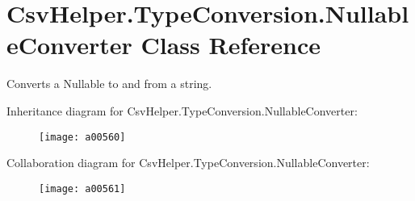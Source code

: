 \hypertarget{a00144}{\section{Csv\-Helper.\-Type\-Conversion.\-Nullable\-Converter Class Reference}
\label{a00144}
}


Converts a Nullable to and from a string.  




Inheritance diagram for Csv\-Helper.\-Type\-Conversion.\-Nullable\-Converter\-:
\nopagebreak
\begin{figure}[H]
\begin{center}
\leavevmode
\texttt{[image: a00560]}
\end{center}
\end{figure}


Collaboration diagram for Csv\-Helper.\-Type\-Conversion.\-Nullable\-Converter\-:
\nopagebreak
\begin{figure}[H]
\begin{center}
\leavevmode
\texttt{[image: a00561]}
\end{center}
\end{figure}
